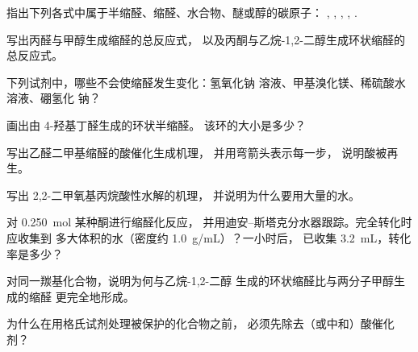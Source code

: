 \begin{exercise}[$\star$]\label{exo:b1:acetals-protection:1}
指出下列各式中属于半缩醛、缩醛、水合物、醚或醇的碳原子：
, , , ,
.
\end{exercise}

\begin{exercise}[$\star$]\label{exo:b1:acetals-protection:2}
写出丙醛与甲醇生成缩醛的总反应式，
以及丙酮与乙烷-1,2-二醇生成环状缩醛的总反应式。
\end{exercise}

\begin{exercise}[$\star$]\label{exo:b1:acetals-protection:3}
下列试剂中，哪些不会使缩醛发生变化：氢氧化钠
溶液、甲基溴化镁、稀硫酸水溶液、硼氢化
钠？
\end{exercise}

\begin{exercise}[$\star$]\label{exo:b1:acetals-protection:4}
画出由 4-羟基丁醛生成的环状半缩醛。
该环的大小是多少？
\end{exercise}

\begin{exercise}[$\star\star$]\label{exo:b1:acetals-protection:5}
写出乙醛二甲基缩醛的酸催化生成机理，
并用弯箭头表示每一步，
说明酸被再生。
\end{exercise}

\begin{exercise}[$\star\star$]\label{exo:b1:acetals-protection:6}
写出 2,2-二甲氧基丙烷酸性水解的机理，
并说明为什么要用大量的水。
\end{exercise}

\begin{exercise}[$\star\star$]\label{exo:b1:acetals-protection:7}
对 \qty{0.250}{mol} 某种酮进行缩醛化反应，
并用迪安–斯塔克分水器跟踪。完全转化时应收集到
多大体积的水（密度约 \qty{1.0}{g/mL}）？一小时后，
已收集 \qty{3.2}{mL}，转化率是多少？
\end{exercise}

\begin{exercise}[$\star\star$]\label{exo:b1:acetals-protection:8}
对同一羰基化合物，说明为何与乙烷-1,2-二醇
生成的环状缩醛比与两分子甲醇生成的缩醛
更完全地形成。
\end{exercise}

\begin{exercise}[$\star\star$]\label{exo:b1:acetals-protection:9}
为什么在用格氏试剂处理被保护的化合物之前，
必须先除去（或中和）酸催化剂？
\end{exercise}

